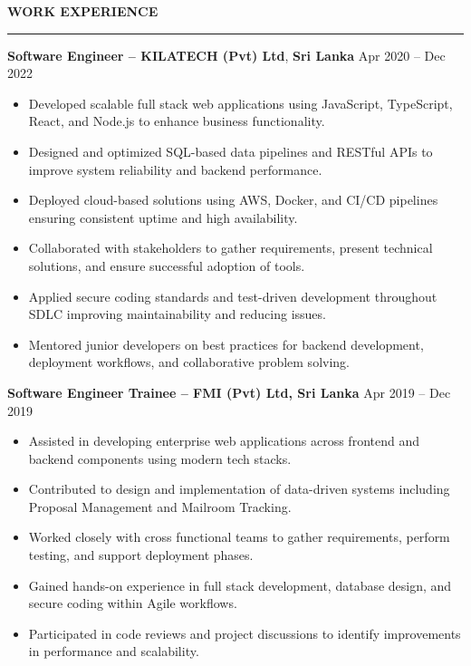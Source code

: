 \documentclass[10pt,letterpaper]{article}
\begin{document}
\textbf{WORK EXPERIENCE}\\[-8pt]
\noindent\rule{\textwidth}{1pt}

\vspace{-2pt}

\textbf{Software Engineer -- KILATECH (Pvt) Ltd}, \textbf{Sri Lanka} \hfill Apr 2020 -- Dec 2022

\vspace{-1pt}

\begin{itemize}
\item Developed scalable full stack web applications using JavaScript, TypeScript, React, and Node.js to enhance business functionality.
\item Designed and optimized SQL-based data pipelines and RESTful APIs to improve system reliability and backend performance.
\item Deployed cloud-based solutions using AWS, Docker, and CI/CD pipelines ensuring consistent uptime and high availability.
\item Collaborated with stakeholders to gather requirements, present technical solutions, and ensure successful adoption of tools.
\item Applied secure coding standards and test-driven development throughout SDLC improving maintainability and reducing issues.
\item Mentored junior developers on best practices for backend development, deployment workflows, and collaborative problem solving.
\end{itemize}

\textbf{Software Engineer Trainee -- FMI (Pvt) Ltd, Sri Lanka} \hfill Apr 2019 -- Dec 2019

\vspace{-1pt}

\begin{itemize}
\item Assisted in developing enterprise web applications across frontend and backend components using modern tech stacks.
\item Contributed to design and implementation of data-driven systems including Proposal Management and Mailroom Tracking.
\item Worked closely with cross functional teams to gather requirements, perform testing, and support deployment phases.
\item Gained hands-on experience in full stack development, database design, and secure coding within Agile workflows.
\item Participated in code reviews and project discussions to identify improvements in performance and scalability.
\end{itemize}
\end{document}
